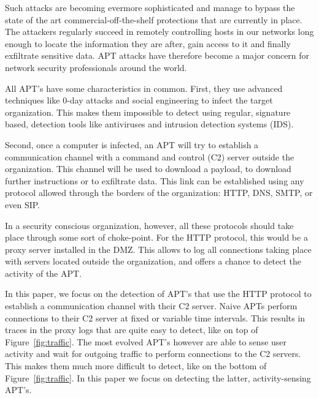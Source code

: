 \documentclass[conference]{IEEEtran}
\begin{document}
Such attacks are becoming evermore sophisticated
and manage to bypass the state of the art 
commercial-off-the-shelf protections that are currently in place.
The attackers regularly succeed in remotely controlling
hosts in our networks long enough to locate the information
they are after, gain access to it and finally
exfiltrate sensitive data. APT attacks have therefore
become a major concern for network security professionals
around the world.

All APT's have some characteristics in common. First, they use advanced techniques like 0-day attacks and social engineering to infect the target organization. This makes them impossible to detect using regular, signature based, detection tools like antiviruses and intrusion detection systems (IDS).

Second, once a computer is infected, an APT will try to establish a communication channel with a command and control (C2) server outside the organization. This channel will be used to download a payload, to download further instructions or to exfiltrate data. This link can be established using any protocol allowed through the borders of the organization: HTTP, DNS, SMTP, or even SIP.

In a security conscious organization, however, all these protocols should take place through some sort of choke-point. For the HTTP protocol, this would be a proxy server installed in the DMZ. This allows to log all connections taking place with servers located outside the organization, and offers a chance to detect the activity of the APT.

In this paper, we focus on the detection of APT's that use the HTTP protocol to establish a communication channel with their C2 server. Naive APTs perform connections to their C2 server at fixed or variable time intervals. This results in traces in the proxy logs that are quite easy to detect, like on top of Figure~\ref{fig:traffic}. The most evolved APT's however are able to sense user activity and wait for outgoing traffic to perform connections to the C2 servers. This makes them much more difficult to detect, like on the bottom of Figure~\ref{fig:traffic}. In this paper we focus on detecting the latter, activity-sensing APT's.
\end{document}
